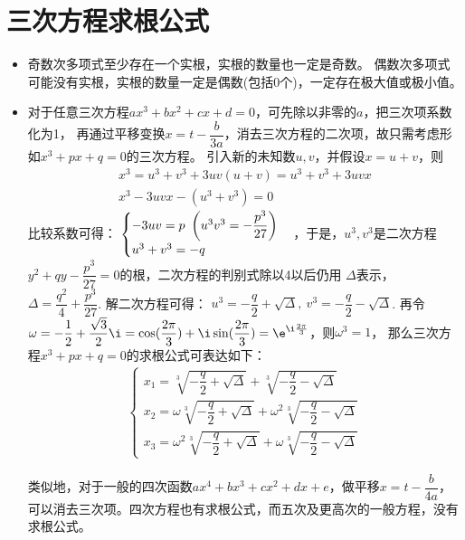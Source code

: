 \section{三次方程求根公式}
\begin{itemize}[leftmargin=\inteval{\myitemleftmargin}pt,itemsep=
   \inteval{\myitemitempsep}pt,topsep=\inteval{\myitemtopsep}pt]
\item 奇数次多项式至少存在一个实根，实根的数量也一定是奇数。
偶数次多项式可能没有实根，实根的数量一定是偶数(包括0个)，一定存在极大值或极小值。

\item 对于任意三次方程$ ax^3+bx^2+cx+d=0 $，可先除以非零的$ a $，把三次项系数化为1，
再通过平移变换$ x=t-\dfrac{b}{3a} $，消去三次方程的二次项，故只需考虑形如$ x^3+px+q=0 $的三次方程。
引入新的未知数$ u,v $，并假设$ x=u+v $，则
\begin{gather*}
    x^3=u^3+v^3+3uv(u+v)=u^3+v^3+3uvx  \\
     x^3-3uvx-(u^3+v^3)=0
\end{gather*}
比较系数可得：
$ \begin{cases}
-3uv = p \ \left(u^3v^3=-\dfrac{p^3}{27} \right) \\
u^3+v^3 = -q
\end{cases} \vspace{-4mm} $，于是，$ u^3,v^3 $是二次方程$ y^2+qy-\dfrac{p^3}{27}=0 $的根，二次方程的判别式除以4以后仍用
$ \Delta $表示，$ \Delta=\dfrac{q^2}{4}+\dfrac{p^3}{27} $. 解二次方程可得：
$ u^3=-\dfrac{q}{2} + \sqrt{\Delta},\ v^3=-\dfrac{q}{2} - \sqrt{\Delta}$.
再令$ \omega=-\dfrac{1}{2}+\dfrac{\sqrt{3}}{2}\i =
\cos(\dfrac{2\pi}{3})+\i\sin(\dfrac{2\pi}{3})=\e^{\i\frac{2\pi}{3}}$，则$ \omega^3=1 $， 那么三次方程$ x^3+px+q=0 $的求根公式可表达如下：
\begin{align*}
\begin{cases}
    x_1= \sqrt[3]{-\dfrac{q}{2} + \sqrt{\Delta}}+
    \sqrt[3]{-\dfrac{q}{2} - \sqrt{\Delta}} \\
    x_2= \omega\sqrt[3]{-\dfrac{q}{2} + \sqrt{\Delta}}+
    \omega^2\sqrt[3]{-\dfrac{q}{2} - \sqrt{\Delta}} \\
    x_3= \omega^2\sqrt[3]{-\dfrac{q}{2} + \sqrt{\Delta}}+
    \omega\sqrt[3]{-\dfrac{q}{2} - \sqrt{\Delta}} 
\end{cases} 
\end{align*}

类似地，对于一般的四次函数$ ax^4+bx^3+cx^2+dx+e $，做平移$ x=t-\dfrac{b}{4a} $，
可以消去三次项。四次方程也有求根公式，而五次及更高次的一般方程，没有求根公式。


\end{itemize}
